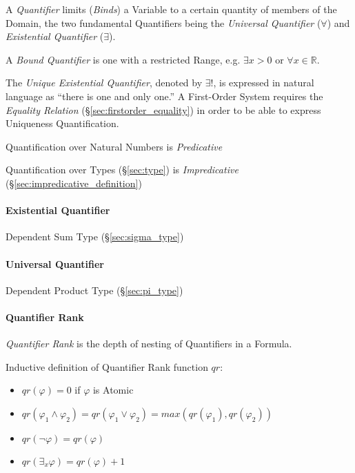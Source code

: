 A \emph{Quantifier} limits (\emph{Binds}) a Variable to a certain
quantity of members of the Domain, the two fundamental Quantifiers
being the \emph{Universal Quantifier} ($\forall$) and
\emph{Existential Quantifier} ($\exists$).

A \emph{Bound Quantifier} is one with a restricted Range, e.g.
$\exists x > 0$ or $\forall x \in \mathbb{R}$.

The \emph{Unique Existential Quantifier}, denoted by $\exists !$, is
expressed in natural language as ``there is one and only one.'' A
First-Order System requires the \emph{Equality Relation}
(\S\ref{sec:firstorder_equality}) in order to be able to express
Uniqueness Quantification.

Quantification over Natural Numbers is \emph{Predicative}

Quantification over Types (\S\ref{sec:type}) is \emph{Impredicative}
(\S\ref{sec:impredicative_definition})



\paragraph{Existential Quantifier}\label{sec:existential_quantifier}\hfill

Dependent Sum Type (\S\ref{sec:sigma_type})



\paragraph{Universal Quantifier}\label{sec:universal_quantifier}\hfill

Dependent Product Type (\S\ref{sec:pi_type})



\paragraph{Quantifier Rank}\label{sec:quantifier_rank}\hfill

\emph{Quantifier Rank} is the depth of nesting of Quantifiers in a
Formula.

Inductive definition of Quantifier Rank function $qr$:
\begin{itemize}
  \item $qr(\varphi) = 0$ if $\varphi$ is Atomic
  \item $qr(\varphi_1 \wedge \varphi_2) =
    qr(\varphi_1 \vee \varphi_2) = max(qr(\varphi_1),qr(\varphi_2))$
  \item $qr(\neg \varphi) = qr(\varphi)$
  \item $qr(\exists_x \varphi) = qr(\varphi) + 1$
\end{itemize}



